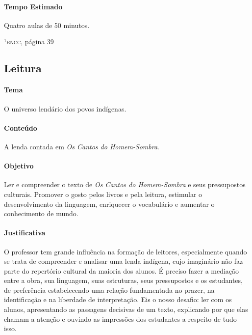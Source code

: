 \documentclass[11pt]{extarticle}
\begin{document}
\paragraph{Tempo Estimado} Quatro aulas de 50 minutos. 


¹\textsc{bncc}, página 39

\subsection{Leitura}

\paragraph{Tema} O universo lendário dos povos indígenas.

\paragraph{Conteúdo} A lenda contada em \textit{Os Cantos do Homem-Sombra}.  

\paragraph{Objetivo} Ler e compreender o texto de \textit{Os Cantos do Homem-Sombra} e seus pressupostos culturais. Promover o gosto pelos livros e pela leitura, estimular o desenvolvimento da linguagem, enriquecer o vocabulário e aumentar o conhecimento de mundo.   

\paragraph{Justificativa} O professor tem grande influência na formação de leitores, especialmente quando se trata de compreender e analisar uma lenda indígena, cujo imaginário não faz parte do repertório cultural da maioria dos alunos. É preciso fazer a mediação entre a obra, sua linguagem, suas estruturas, seus pressupostos e os estudantes, de preferência estabelecendo uma relação fundamentada no prazer, na identificação e na liberdade de interpretação. Eis o nosso desafio: ler com os alunos, apresentando as passagens decisivas de um texto, explicando por que elas chamam a atenção e  ouvindo as impressões dos estudantes a respeito de tudo isso.  
\end{document}
